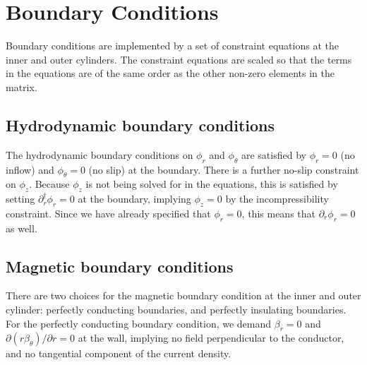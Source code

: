 \documentclass[letterpaper]{article}
\begin{document}
\section{Boundary Conditions}

Boundary conditions are implemented by a set of constraint equations
at the inner and outer cylinders. The constraint equations are scaled
so that the terms in the equations are of the same order as the other
non-zero elements in the matrix.

\subsection{Hydrodynamic boundary conditions}

The hydrodynamic boundary conditions on $\phi_r$ and $\phi_\theta$ are
satisfied by $\phi_r = 0$ (no inflow) and $\phi_\theta = 0$ (no slip)
at the boundary.  There is a further no-slip constraint on $\phi_z$.
Because $\phi_z$ is not being solved for in the equations, this is
satisfied by setting $\partial_r^\dagger \phi_r = 0$ at the boundary,
implying $\phi_z=0$ by the incompressibility constraint. Since we have
already specified that $\phi_r=0$, this means that $\partial_r
\phi_r=0$ as well.

\subsection{Magnetic boundary conditions}

There are two choices for the magnetic boundary condition at the inner
and outer cylinder: perfectly conducting boundaries, and perfectly
insulating boundaries.  For the perfectly conducting boundary
condition, we demand $\beta_r = 0$ and $\partial (r
\beta_\theta)/\partial r = 0$ at the wall, implying no field
perpendicular to the conductor, and no tangential component of the
current density.
\end{document}
